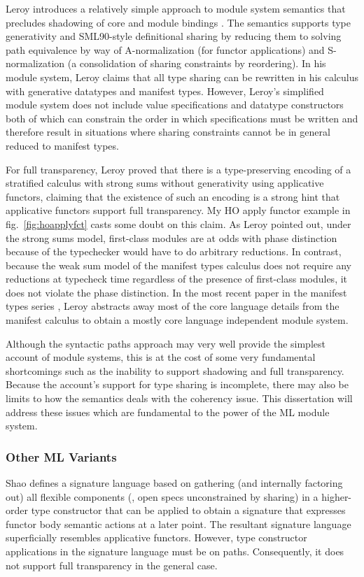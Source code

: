 Leroy introduces a relatively simple approach to module system semantics that precludes shadowing of core and module bindings \cite{Leroy:generativity,leroy00}.
The semantics supports type generativity and SML90-style definitional sharing by reducing them to solving path equivalence by way of A-normalization (for functor applications) and S-normalization (a consolidation of sharing constraints by reordering). In his module system, Leroy claims that all type sharing can be rewritten in his calculus with generative datatypes and manifest types. However, Leroy's simplified module system does not include value specifications and datatype constructors both of which can constrain the order in which specifications must be written and therefore result in situations where sharing constraints cannot be in general reduced to manifest types. 

For full transparency, Leroy proved that there is a type-preserving encoding of a stratified calculus with strong sums without generativity using applicative functors\cite{leroy95}, claiming that the existence of such an encoding is a strong hint that applicative functors support full transparency. My HO apply functor example in fig.~\ref{fig:hoapplyfct} casts some doubt on this claim. As Leroy pointed out, under the strong sums model, first-class modules are at odds with phase distinction because of the typechecker would have to do arbitrary reductions\cite{leroy94}. In contrast, because the weak sum model of the manifest types calculus does not require any reductions at typecheck time regardless of the presence of first-class modules, it does not violate the phase distinction\cite{leroy94}. In the most recent paper in the manifest types series \cite{leroy00}, Leroy abstracts away most of the core language details from the manifest calculus to obtain a mostly core language independent module system. 

Although the syntactic paths approach may very well provide the simplest account of module systems, this is at the cost of some very fundamental shortcomings such as the inability to support shadowing and full transparency. Because the account's support for type sharing is incomplete, there may also be limits to how the semantics deals with the coherency issue. This dissertation will address these issues which are fundamental to the power of the ML module system. 

\subsubsection{Other ML Variants}
Shao \cite{shao:parameterizedsigsandho,shao99} defines a signature language based on gathering (and
internally factoring out) all flexible components (\ie, open 
specs unconstrained by sharing) in a higher-order type
constructor that can be applied to obtain a signature that expresses
functor body semantic actions at a later point. The resultant
signature language superficially resembles applicative
functors. However, type constructor applications in the signature
language must be on paths. Consequently, it does not support full
transparency in the general case. 

